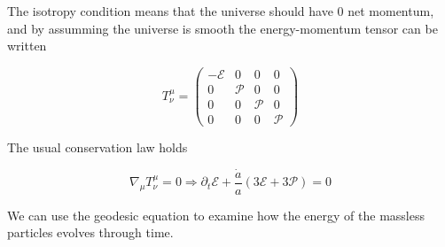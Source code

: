 The isotropy condition means that the universe should have 0 net momentum, and by assumming the universe is smooth the energy-momentum tensor can be written

\begin{equation} T^\mu_\nu = \left(
\begin{array}{cccc}
    -\mathcal{E} & 0 & 0 & 0 \\
    0 & \mathcal{P} & 0 & 0 \\
    0 & 0 & \mathcal{P} & 0 \\
    0 & 0 & 0 & \mathcal{P}
\end{array}
\right)
\end{equation}

The usual conservation law holds

\begin{equation}
    \nabla_\mu T^{\mu}_{\nu} = 0 \Rightarrow \partial_t \mathcal{E} + \frac{\dot a}{a}(3\mathcal{E} + 3\mathcal{P}) = 0
\end{equation}

We can use the geodesic equation to examine how the energy of the massless particles evolves through time. 
